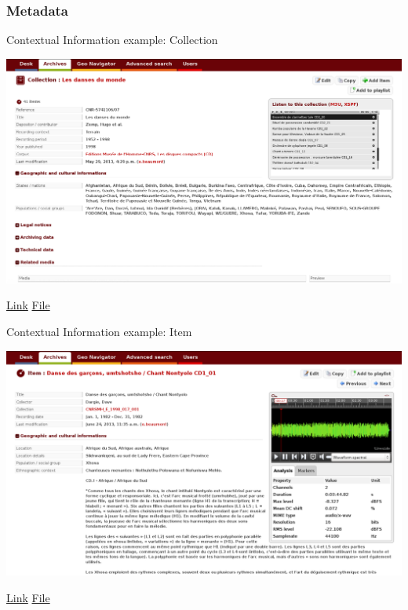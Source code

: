 \documentclass[final, hyperref, table]{beamer}
\begin{document}
\subsubsection{Metadata}
\begin{frame}{Contextual Information example: Collection}
  \begin{center}
    \includegraphics[width=1.1\textwidth]{telemeta_metadata_collection.png}
  \end{center}
\href{http://archives.crem-cnrs.fr/archives/collections/CNRSMH_E_1998_017_001/}{Link}
 \href{./captures/Collection.html}{File}
\hyperlink{telemeta_metadata}{}
\end{frame}
\begin{frame}{Contextual Information example: Item}
  \begin{center}
    \includegraphics[width=1.1\textwidth]{telemeta_metadata_item.png}
  \end{center}
  \href{http://archives.crem-cnrs.fr/archives/items/CNRSMH_E_1998_017_001_001_01/}{Link}
 \href{./captures/Item.html}{File}
\hyperlink{telemeta_metadata}{}
\end{frame}
\end{document}
